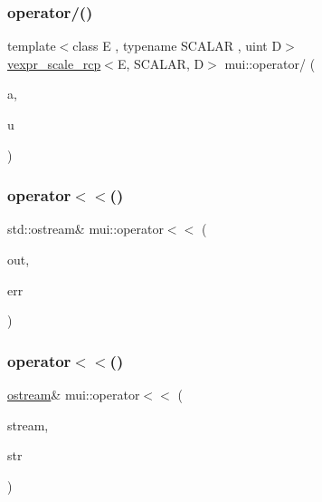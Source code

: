 \subsubsection{\texorpdfstring{operator/()}{operator/()}\hspace{0.1cm}{\footnotesize\ttfamily [3/3]}}
{\footnotesize\ttfamily template$<$class E , typename S\+C\+A\+L\+AR , uint D$>$ \\
\hyperlink{structmui_1_1vexpr__scale__rcp}{vexpr\+\_\+scale\+\_\+rcp}$<$E, S\+C\+A\+L\+AR, D$>$ mui\+::operator/ (\begin{DoxyParamCaption}\item[{S\+C\+A\+L\+AR const}]{a,  }\item[{\hyperlink{structmui_1_1vexpr}{vexpr}$<$ E, S\+C\+A\+L\+AR, D $>$ const \&}]{u }\end{DoxyParamCaption})\hspace{0.3cm}{\ttfamily [inline]}}

\mbox{\label{namespacemui_af3c71f2b8c435b7dc118810da8bb52b3}} 
\subsubsection{\texorpdfstring{operator$<$$<$()}{operator<<()}\hspace{0.1cm}{\footnotesize\ttfamily [1/21]}}
{\footnotesize\ttfamily std\+::ostream\& mui\+::operator$<$$<$ (\begin{DoxyParamCaption}\item[{std\+::ostream \&}]{out,  }\item[{std\+::exception const \&}]{err }\end{DoxyParamCaption})\hspace{0.3cm}{\ttfamily [inline]}}

\mbox{\label{namespacemui_aef4e1b70b6245ef114b5ebeee77e0d05}} 
\subsubsection{\texorpdfstring{operator$<$$<$()}{operator<<()}\hspace{0.1cm}{\footnotesize\ttfamily [2/21]}}
{\footnotesize\ttfamily \hyperlink{classmui_1_1ostream}{ostream}\& mui\+::operator$<$$<$ (\begin{DoxyParamCaption}\item[{\hyperlink{classmui_1_1ostream}{ostream} \&}]{stream,  }\item[{const std\+::string \&}]{str }\end{DoxyParamCaption})\hspace{0.3cm}{\ttfamily [inline]}}

